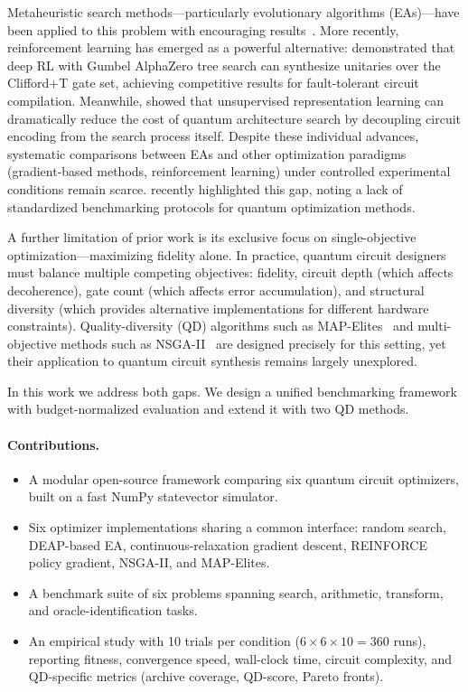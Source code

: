 \documentclass[twocolumn,11pt]{article}
\begin{document}
Metaheuristic search methods---particularly evolutionary algorithms
(EAs)---have been applied to this problem with encouraging
results~\cite{williams1998automated, massey2005evolving, las2016genetic}.
More recently, reinforcement learning has emerged as a powerful alternative:
\citet{rietsch2024unitary} demonstrated that deep RL with Gumbel AlphaZero
tree search can synthesize unitaries over the Clifford+T gate set, achieving
competitive results for fault-tolerant circuit compilation.  Meanwhile,
\citet{sun2026qas} showed that unsupervised representation learning can
dramatically reduce the cost of quantum architecture search by decoupling
circuit encoding from the search process itself.  Despite these individual
advances, systematic comparisons between EAs and other optimization paradigms
(gradient-based methods, reinforcement learning) under controlled experimental
conditions remain scarce.  \citet{sharma2025comparative} recently highlighted
this gap, noting a lack of standardized benchmarking protocols for quantum
optimization methods.

A further limitation of prior work is its exclusive focus on single-objective
optimization---maximizing fidelity alone.  In practice, quantum circuit
designers must balance multiple competing objectives: fidelity, circuit depth
(which affects decoherence), gate count (which affects error accumulation),
and structural diversity (which provides alternative implementations for
different hardware constraints).  Quality-diversity (QD) algorithms such as
MAP-Elites~\cite{mouret2015illuminating} and multi-objective methods such as
NSGA-II~\cite{deb2002nsga2} are designed precisely for this setting, yet their
application to quantum circuit synthesis remains largely unexplored.

In this work we address both gaps.  We design a unified benchmarking framework
with budget-normalized evaluation and extend it with two QD methods.

\paragraph{Contributions.}
\begin{itemize}[nosep]
    \item A modular open-source framework comparing six quantum circuit
          optimizers, built on a fast NumPy statevector simulator.
    \item Six optimizer implementations sharing a common interface: random
          search, DEAP-based EA, continuous-relaxation gradient descent,
          REINFORCE policy gradient, NSGA-II, and MAP-Elites.
    \item A benchmark suite of six problems spanning search, arithmetic,
          transform, and oracle-identification tasks.
    \item An empirical study with 10 trials per condition ($6 \times 6 \times
          10 = 360$ runs), reporting fitness, convergence speed, wall-clock
          time, circuit complexity, and QD-specific metrics (archive coverage,
          QD-score, Pareto fronts).
\end{itemize}
\end{document}
